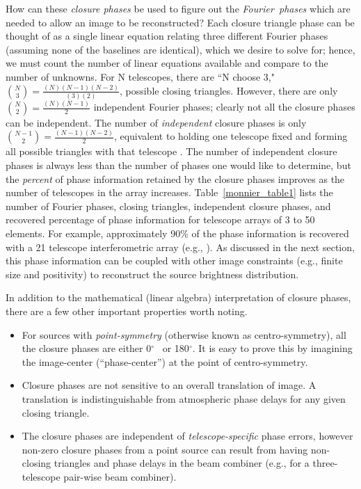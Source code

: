 \documentclass[12pt]{iopart}
\def\arcdegg{\hbox{$^\circ$}}
\begin{document}
\label{monnier_relations}
How can these {\em closure phases} be used to figure out the {\em
  Fourier~phases} which are needed to allow an image to be
reconstructed?  Each closure triangle phase can be thought of as a
single linear equation relating three different Fourier phases
(assuming none of the baselines are identical), which we desire to
solve for; hence, we must count the number of linear equations
available and compare to the number of unknowns.  For N telescopes,
there are ``N choose 3,"
${{N}\choose{3}}=\frac{(N)(N-1)(N-2)}{(3)(2)}$, possible closing
triangles.  However, there are only
${{N}\choose{2}}=\frac{(N)(N-1)}{2}$ independent Fourier phases;
clearly not all the closure phases can be independent.  The number of
{\em independent} closure phases is only
${{N-1}\choose{2}}=\frac{(N-1)(N-2)}{2}$, equivalent to holding one
telescope fixed and forming all possible triangles with that telescope
\citep[as discussed by][]{readhead88}.  The number of independent
closure phases is always less than the number of phases one would like
to determine, but the {\em percent} of phase information retained by
the closure phases improves as the number of telescopes in the array
increases.  Table~\ref{monnier_table1} lists the number of Fourier
phases, closing triangles, independent closure phases, and recovered
percentage of phase information for telescope arrays of 3 to 50
elements.  For example, approximately 90\% of the phase information is
recovered with a 21 telescope interferometric array (e.g.,
\citealt{readhead88}).  As discussed in the next section, this phase
information can be coupled with other image constraints (e.g., finite
size and positivity) to reconstruct the source brightness
distribution.

In addition to the mathematical (linear algebra) interpretation of
closure phases, there are a few other important properties worth
noting.

\begin{itemize}
\item{For sources with {\em point-symmetry} (otherwise known as
    centro-symmetry), all the closure phases are either 0\arcdegg~ or
    180\arcdegg.  It is easy to prove this by imagining the
    image-center (``phase-center'') at the point of centro-symmetry.}
\item{Closure phases are not sensitive to an overall translation of image.
A translation is indistinguishable from atmospheric phase delays for any
given closing triangle.}
\item{The closure phases are independent of {\em telescope-specific}
    phase errors, however non-zero closure phases from a point source
    can result from having non-closing triangles and phase delays in
    the beam combiner (e.g., for a three-telescope pair-wise beam
    combiner).}
\end{itemize}
\end{document}
